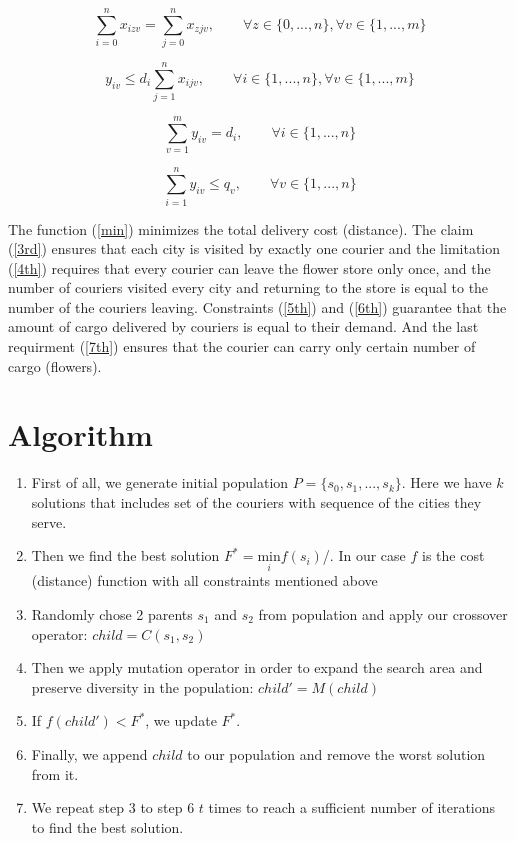 \documentclass{article}
\begin{document}
\begin{equation} \label{4th}
\sum_{i=0}^{n} x_{izv} = \sum_{j=0}^{n} x_{zjv} , \qquad \forall z \in \{0,...,n\}, \forall v \in \{1,...,m\}
\end{equation}

\begin{equation} \label{5th}
y_{iv} \leq d_i\sum_{j=1}^{n} x_{ijv}, \qquad \forall i \in \{1,...,n\}, \forall v \in \{1,...,m\}
\end{equation}

\begin{equation} \label{6th}
\sum_{v=1}^{m} y_{iv} = d_i, \qquad \forall i \in \{1,...,n\}
\end{equation}

\begin{equation} \label{7th}
\sum_{i=1}^{n} y_{iv} \leq q_v, \qquad \forall v \in \{1,...,n\}
\end{equation}

The function (\ref{min}) minimizes the total delivery cost (distance). The claim (\ref{3rd}) ensures that each city is visited by exactly one courier and the limitation (\ref{4th}) requires that every courier can leave the flower store only once, and the number of couriers visited every city and returning to the store is equal to the number of the couriers leaving. Constraints (\ref{5th}) and (\ref{6th}) guarantee that the amount of cargo delivered by couriers is equal to their demand. And the last requirment (\ref{7th}) ensures that the courier can carry only certain number of cargo (flowers).

\section{Algorithm}
\begin{enumerate}
  \item First of all, we generate initial population $ P =  \{s_0,s_1,...,s_k\}$. Here we have $k$ solutions that includes set of the couriers with sequence of the cities they serve. 
  \item Then we find the best solution $F^* = \underset{i}{\text{min}}f(s_i)$/. In our case $f$ is the cost (distance) function with all constraints mentioned above
  \item Randomly chose 2 parents $s_1$ and $s_2$ from population and apply our crossover operator: $child = C(s_1,s_2)$
  \item Then we apply mutation operator in order to expand the search area and preserve diversity in the population: $child' = M(child)$
  \item If $f(child') < F^*$, we update $F^*$. 
  \item Finally, we append $child$ to our population and remove the worst solution from it. 
  \item We repeat step 3 to step 6 $t$ times to reach a sufficient number of iterations to find the best solution.
\end{enumerate}
\end{document}
